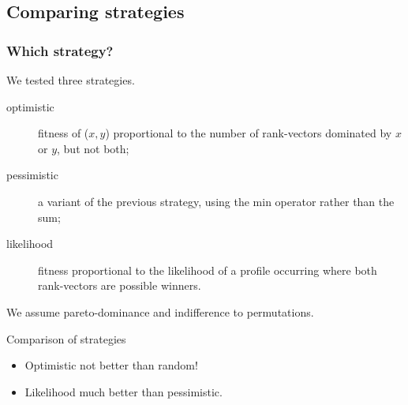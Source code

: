 \documentclass[english]{beamer}
\begin{document}
\subsection{Comparing strategies}
\begin{frame}
	\frametitle{Which strategy?}
	
	We tested three strategies.
	\begin{description}
		\item[optimistic] fitness of ($x, y$) proportional to the number of rank-vectors dominated by $x$ or $y$, but not both;
		\item[pessimistic] a variant of the previous strategy, using the min operator rather than the sum;
		\item[likelihood] fitness proportional to the likelihood of a profile occurring where both rank-vectors are possible winners.%
	\end{description}
	We assume pareto-dominance and indifference to permutations.
	\begin{block}{Comparison of strategies}
		\begin{itemize}
			\item Optimistic not better than random!
			\item Likelihood much better than pessimistic.
		\end{itemize}
	\end{block}
\end{frame}
\end{document}
